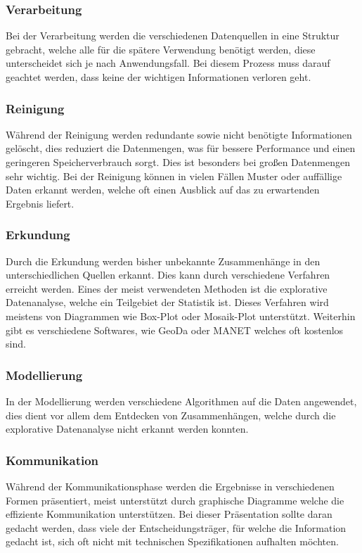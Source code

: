			\subsubsection{Verarbeitung}
				Bei der Verarbeitung werden die verschiedenen Datenquellen in eine Struktur gebracht, welche alle für die spätere Verwendung benötigt werden, diese unterscheidet sich je nach Anwendungsfall. 
				Bei diesem Prozess muss darauf geachtet werden, dass keine der wichtigen Informationen verloren geht. 		
			\subsubsection{Reinigung}
				Während der Reinigung werden redundante sowie nicht benötigte Informationen gelöscht, dies reduziert die Datenmengen, was für bessere Performance und einen geringeren Speicherverbrauch sorgt. 
				Dies ist besonders bei großen Datenmengen sehr wichtig. Bei der Reinigung können in vielen Fällen Muster oder auffällige Daten erkannt werden, welche oft einen Ausblick auf das zu erwartenden Ergebnis liefert. 		
			\subsubsection{Erkundung}
				Durch die Erkundung werden bisher unbekannte Zusammenhänge in den unterschiedlichen Quellen erkannt. Dies kann durch verschiedene Verfahren erreicht werden.
				Eines der meist verwendeten Methoden ist die explorative Datenanalyse, welche ein Teilgebiet der Statistik ist. Dieses Verfahren wird meistens von Diagrammen wie Box-Plot oder Mosaik-Plot unterstützt. Weiterhin gibt es verschiedene Softwares, wie GeoDa oder MANET welches oft kostenlos sind. 				 
			\subsubsection{Modellierung}
				In der Modellierung werden verschiedene Algorithmen auf die Daten angewendet, dies dient vor allem dem Entdecken von Zusammenhängen, welche durch die explorative Datenanalyse nicht erkannt werden konnten. 			
			\subsubsection{Kommunikation}
				Während der Kommunikationsphase werden die Ergebnisse in verschiedenen Formen präsentiert, meist unterstützt durch graphische Diagramme welche die effiziente Kommunikation unterstützen. 
				Bei dieser Präsentation sollte daran gedacht werden, dass viele der Entscheidungsträger, für welche die Information gedacht ist, sich oft nicht mit technischen Spezifikationen aufhalten möchten. 		
